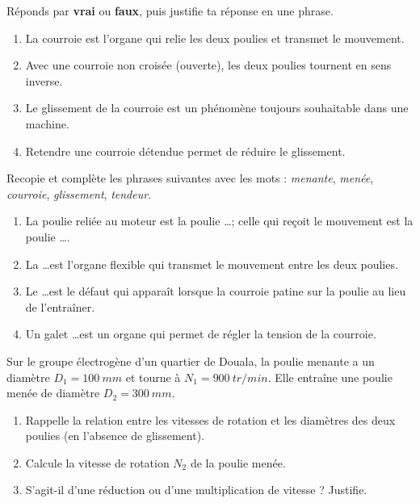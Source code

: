 \documentclass[11pt]{article}
\begin{document}
\begin{exercice}
Réponds par \textbf{vrai} ou \textbf{faux}, puis justifie ta réponse en une phrase.
\begin{enumerate}
\item La courroie est l'organe qui relie les deux poulies et transmet le mouvement.
\item Avec une courroie non croisée (ouverte), les deux poulies tournent en sens inverse.
\item Le glissement de la courroie est un phénomène toujours souhaitable dans une machine.
\item Retendre une courroie détendue permet de réduire le glissement.
\end{enumerate}
\end{exercice}

\begin{exercice}
Recopie et complète les phrases suivantes avec les mots : \emph{menante}, \emph{menée}, \emph{courroie}, \emph{glissement}, \emph{tendeur}.
\begin{enumerate}
\item La poulie reliée au moteur est la poulie \dots ; celle qui reçoit le mouvement est la poulie \dots .
\item La \dots est l'organe flexible qui transmet le mouvement entre les deux poulies.
\item Le \dots est le défaut qui apparaît lorsque la courroie patine sur la poulie au lieu de l'entraîner.
\item Un galet \dots est un organe qui permet de régler la tension de la courroie.
\end{enumerate}
\end{exercice}

\begin{exercice}
Sur le groupe électrogène d'un quartier de Douala, la poulie menante a un diamètre $D_1 = \SI{100}{mm}$ et tourne à $N_1 = \SI{900}{tr/min}$. Elle entraîne une poulie menée de diamètre $D_2 = \SI{300}{mm}$.
\begin{enumerate}
\item Rappelle la relation entre les vitesses de rotation et les diamètres des deux poulies (en l'absence de glissement).
\item Calcule la vitesse de rotation $N_2$ de la poulie menée.
\item S'agit-il d'une réduction ou d'une multiplication de vitesse ? Justifie.
\end{enumerate}
\end{exercice}
\end{document}
